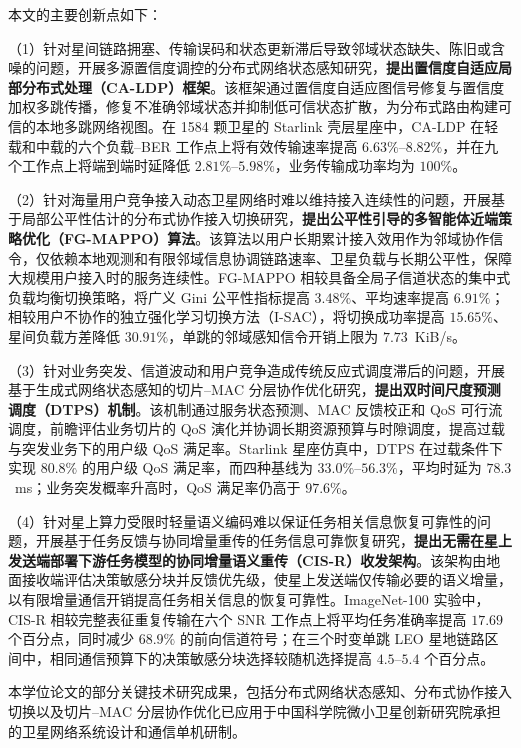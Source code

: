 本文的主要创新点如下：

（1）针对星间链路拥塞、传输误码和状态更新滞后导致邻域状态缺失、陈旧或含噪的问题，开展多源置信度调控的分布式网络状态感知研究，\textbf{提出置信度自适应局部分布式处理（CA-LDP）框架}。该框架通过置信度自适应图信号修复与置信度加权多跳传播，修复不准确邻域状态并抑制低可信状态扩散，为分布式路由构建可信的本地多跳网络视图。在 1584 颗卫星的 Starlink 壳层星座中，CA-LDP 在轻载和中载的六个负载--BER 工作点上将有效传输速率提高 $6.63\%$--$8.82\%$，并在九个工作点上将端到端时延降低 $2.81\%$--$5.98\%$，业务传输成功率均为 $100\%$。

（2）针对海量用户竞争接入动态卫星网络时难以维持接入连续性的问题，开展基于局部公平性估计的分布式协作接入切换研究，\textbf{提出公平性引导的多智能体近端策略优化（FG-MAPPO）算法}。该算法以用户长期累计接入效用作为邻域协作信令，仅依赖本地观测和有限邻域信息协调链路速率、卫星负载与长期公平性，保障大规模用户接入时的服务连续性。FG-MAPPO 相较具备全局子信道状态的集中式负载均衡切换策略，将广义 Gini 公平性指标提高 $3.48\%$、平均速率提高 $6.91\%$；相较用户不协作的独立强化学习切换方法（I-SAC），将切换成功率提高 $15.65\%$、星间负载方差降低 $30.91\%$，单跳的邻域感知信令开销上限为 $7.73$~KiB/s。

（3）针对业务突发、信道波动和用户竞争造成传统反应式调度滞后的问题，开展基于生成式网络状态感知的切片--MAC 分层协作优化研究，\textbf{提出双时间尺度预测调度（DTPS）机制}。该机制通过服务状态预测、MAC 反馈校正和 QoS 可行流调度，前瞻评估业务切片的 QoS 演化并协调长期资源预算与时隙调度，提高过载与突发业务下的用户级 QoS 满足率。Starlink 星座仿真中，DTPS 在过载条件下实现 $80.8\%$ 的用户级 QoS 满足率，而四种基线为 $33.0\%$--$56.3\%$，平均时延为 $78.3$~ms；业务突发概率升高时，QoS 满足率仍高于 $97.6\%$。

（4）针对星上算力受限时轻量语义编码难以保证任务相关信息恢复可靠性的问题，开展基于任务反馈与协同增量重传的任务信息可靠恢复研究，\textbf{提出无需在星上发送端部署下游任务模型的协同增量语义重传（CIS-R）收发架构}。该架构由地面接收端评估决策敏感分块并反馈优先级，使星上发送端仅传输必要的语义增量，以有限增量通信开销提高任务相关信息的恢复可靠性。ImageNet-100 实验中，CIS-R 相较完整表征重复传输在六个 SNR 工作点上将平均任务准确率提高 $17.69$ 个百分点，同时减少 $68.9\%$ 的前向信道符号；在三个时变单跳 LEO 星地链路区间中，相同通信预算下的决策敏感分块选择较随机选择提高 $4.5$--$5.4$ 个百分点。

本学位论文的部分关键技术研究成果，包括分布式网络状态感知、分布式协作接入切换以及切片--MAC 分层协作优化已应用于中国科学院微小卫星创新研究院承担的卫星网络系统设计和通信单机研制。



